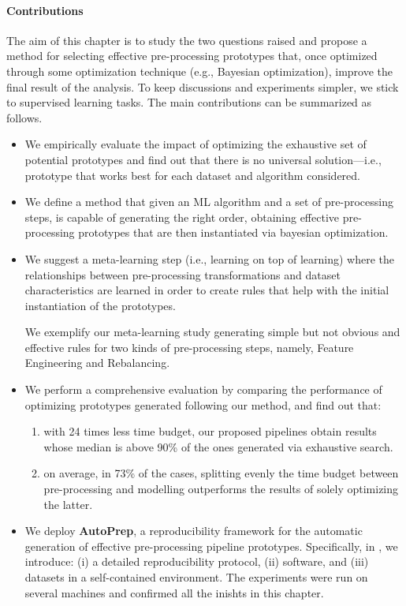 \paragraph{Contributions} The aim of this chapter is to study the two questions raised and propose a method for selecting effective pre-processing prototypes that, once optimized through some optimization technique (e.g., Bayesian optimization), improve the final result of the analysis.
To keep discussions and experiments simpler, we stick to supervised learning tasks.
The main contributions can be summarized as follows.
\begin{itemize}
    \item We empirically evaluate the impact of optimizing the exhaustive set of potential prototypes and find out that	there is no universal solution---i.e., prototype that works best for each dataset and algorithm considered.
    \item We define a method that given an ML algorithm and a set of pre-processing steps, is capable of generating the right order, obtaining effective pre-processing prototypes that are then instantiated via bayesian optimization.
    \item We suggest a meta-learning step (i.e., learning on top of learning) where the relationships between pre-processing transformations and dataset characteristics are learned in order to create rules that help with the initial instantiation of the prototypes.

	We exemplify our meta-learning study generating simple but not obvious and effective rules for two kinds of pre-processing steps, namely, Feature Engineering and Rebalancing.
    \item We perform a comprehensive evaluation by comparing the performance of optimizing prototypes generated following our method, and find out that:
    \begin{enumerate}
        \item with 24 times less time budget, our proposed pipelines obtain results whose median is above 90\% of the ones generated via exhaustive search.
        \item on average, in 73\% of the cases, splitting evenly the time budget between pre-processing and modelling outperforms the results of solely optimizing the latter.
    \end{enumerate}
	\item We deploy \textbf{AutoPrep}, a reproducibility framework for the automatic generation of effective pre-processing pipeline prototypes. Specifically, in \cite{giovanelli2023reproducible}, we introduce: (i) a detailed reproducibility protocol, (ii) software, and (iii) datasets in a self-contained environment.
	The experiments were run on several machines and confirmed all the inishts in this chapter.
\end{itemize}

